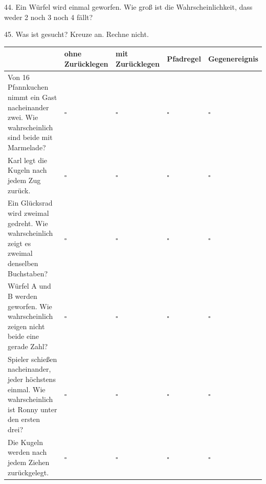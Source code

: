 \documentclass[11pt]{article}
\begin{document}
\pfgruppe{}
\begin{pfaufg}{}{44.}{}
Ein Würfel wird einmal geworfen. Wie groß ist die Wahrscheinlichkeit, dass weder 2 noch 3 noch 4 fällt?
\end{pfaufg}
\par\Needspace*{0.55\textheight}
\begin{pfaufg}{}{45.}{}
Was ist gesucht? Kreuze an. Rechne nicht.
\par\smallskip\noindent \begingroup\renewcommand{\arraystretch}{1.4}\begin{tabular}{|>{\raggedright\arraybackslash}p{4.3cm}|>{\centering\arraybackslash\hyphenpenalty=0}p{1.55cm}|>{\centering\arraybackslash\hyphenpenalty=0}p{1.55cm}|>{\centering\arraybackslash\hyphenpenalty=0}p{1.55cm}|>{\centering\arraybackslash\hyphenpenalty=0}p{1.55cm}|}\hline  & {\scriptsize\hspace{0pt}ohne Zurücklegen} & {\scriptsize\hspace{0pt}mit Zurücklegen} & {\scriptsize\hspace{0pt}Pfadregel} & {\scriptsize\hspace{0pt}Gegenereignis} \\ \hline Von 16 Pfannkuchen nimmt ein Gast nacheinander zwei. Wie wahrscheinlich sind beide mit Marmelade? & $\square$ & $\square$ & $\square$ & $\square$ \\ \hline Karl legt die Kugeln nach jedem Zug zurück. & $\square$ & $\square$ & $\square$ & $\square$ \\ \hline Ein Glücksrad wird zweimal gedreht. Wie wahrscheinlich zeigt es zweimal denselben Buchstaben? & $\square$ & $\square$ & $\square$ & $\square$ \\ \hline Würfel A und B werden geworfen. Wie wahrscheinlich zeigen nicht beide eine gerade Zahl? & $\square$ & $\square$ & $\square$ & $\square$ \\ \hline 11 Spieler schießen nacheinander, jeder höchstens einmal. Wie wahrscheinlich ist Ronny unter den ersten drei? & $\square$ & $\square$ & $\square$ & $\square$ \\ \hline Die Kugeln werden nach jedem Ziehen zurückgelegt. & $\square$ & $\square$ & $\square$ & $\square$ \\ \hline\end{tabular}\endgroup\par
\end{pfaufg}
\end{document}
